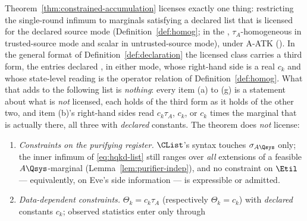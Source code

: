 
\begin{remark}\label{rem:not-licensed}
Theorem~\ref{thm:constrained-accumulation} licenses exactly one thing:
restricting the single-round infimum to marginals satisfying a declared list
that is licensed for the declared source mode (Definition~\ref{def:homog}; in
the , $\tau_A$-homogeneous in trusted-source mode and
scalar in untrusted-source mode), under A-ATK
(). In the general format of
Definition~\ref{def:declaration} the licensed class carries a third form, the
entries declared , in either mode, whose right-hand side is
a real $c_k$ and whose state-level reading is the operator relation of
Definition~\ref{def:homog}. What that adds to the following list is
\emph{nothing}: every item (a) to (g) is a statement about what is \emph{not}
licensed, each holds of the third form as it holds of the other two, and
item (b)'s right-hand sides read $c_k\tau_A$, $c_k$, or $c_k$ times the
marginal that is actually there, all three with \emph{declared} constants.
The theorem does \emph{not} license:
\begin{enumerate}[label=(\alph*),leftmargin=2.2em]
\item \emph{Constraints on the purifying register.} $\CList$'s syntax
touches $\sigma_{A\Qsys}$ only; the inner infimum of
\eqref{eq:hqkd-list} still ranges over \emph{all} extensions of a
feasible $A\Qsys$-marginal (Lemma~\ref{lem:purifier-indep}), and no
constraint on $\Etil$ --- equivalently, on Eve's side information ---
is expressible or admitted.
\item \emph{Data-dependent constraints.} $\Theta_k=c_k\tau_A$
(respectively $\Theta_k=c_k$) with \emph{declared} constants $c_k$;
observed statistics enter only through

\end{enumerate}
\end{remark}

